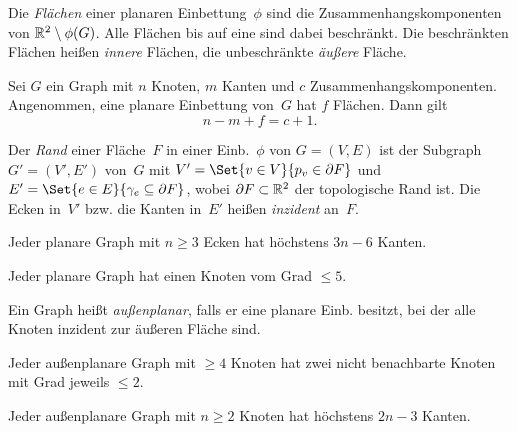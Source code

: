 \documentclass{cheat-sheet}
\newcommand{\boundary}{\partial} %
\newcommand{\Youtube}[1]{\href{https://www.youtube.com/watch?v=#1}{\textcolor{YoutubeColor}{$\blacktriangleright$}}}
\begin{document}
\begin{defn}
  Die \emph{Flächen} einer planaren Einbettung~$\phi$ sind die Zusammenhangskomponenten von $\mathbb{R}^2 \setminus \phi(G)$.
  Alle Flächen bis auf eine sind dabei beschränkt.
  Die beschränkten Flächen heißen \textit{innere} Flächen, die unbeschränkte \textit{äußere} Fläche.
\end{defn}

\begin{satz}[\emph{Euler-Formel}, \Youtube{5ywif1Zpeo4}]
  Sei $G$ ein Graph mit $n$ Knoten, $m$ Kanten und $c$ Zusammenhangskomponenten.
  Angenommen, eine planare Einbettung von~$G$ hat $f$ Flächen.
  Dann gilt
  \[ n - m + f = c + 1. \]
\end{satz}

\begin{defn}
  Der \emph{Rand} einer Fläche~$F$ in einer Einb.~$\phi$ von $G = (V, E)$ ist der Subgraph $G' = (V', E')$ von~$G$ mit $V' = \Set{v \in V}{p_v \in \boundary{F}}$ und $E' = \Set{e \in E}{\gamma_e \subseteq \boundary{F}}$, wobei $\boundary F \subset \R^2$ der topologische Rand ist.
  Die Ecken in~$V'$ bzw. die Kanten in~$E'$ heißen \emph{inzident} an~$F$.
\end{defn}

\begin{lem}[\Youtube{_d_6JvceAwE}]
  \begin{minipage}[t]{0.75 \linewidth}
    Jeder planare Graph mit $n \geq 3$ Ecken hat höchstens $3 n - 6$ Kanten.
  \end{minipage}
\end{lem}

\begin{kor}
  Jeder planare Graph hat einen Knoten vom Grad $\leq 5$.
\end{kor}

\begin{defn}
  Ein Graph heißt \emph{außenplanar}, falls er eine planare Einb. besitzt, bei der alle Knoten inzident zur äußeren Fläche sind.
\end{defn}

\begin{lem}
  \begin{minipage}[t]{0.8 \linewidth}
    Jeder außenplanare Graph mit $\geq 4$ Knoten hat zwei nicht benachbarte Knoten mit Grad jeweils $\leq 2$.
  \end{minipage}
\end{lem}

\begin{lem}
  \begin{minipage}[t]{0.72 \linewidth}
    Jeder außenplanare Graph mit $n \geq 2$ Knoten hat höchstens $2 n - 3$ Kanten.
  \end{minipage}
\end{lem}
\end{document}

